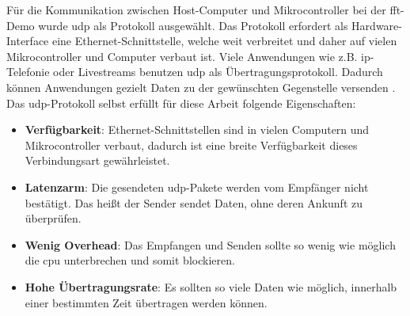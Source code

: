 \documentclass[../EDF Master Thesis.tex]{subfiles}
\begin{document}
    Für die Kommunikation zwischen Host-Computer und Mikrocontroller bei der \ac{fft}-Demo wurde \ac{udp} als Protokoll ausgewählt.
    Das Protokoll erfordert als Hardware-Interface eine Ethernet-Schnittstelle, welche weit verbreitet und daher auf vielen Mikrocontroller und Computer verbaut ist.
    Viele Anwendungen wie z.B. \ac{ip}-Telefonie oder Livestreams benutzen \ac{udp} als Übertragungsprotokoll.
    Dadurch können Anwendungen gezielt Daten zu der gewünschten Gegenstelle versenden \parencite{elektronik_kompendium}.
    Das \ac{udp}-Protokoll selbst erfüllt für diese Arbeit folgende Eigenschaften:
    \begin{itemize}
        \item \textbf{Verfügbarkeit}: Ethernet-Schnittstellen sind in vielen Computern und Mikrocontroller verbaut, dadurch ist eine breite Verfügbarkeit dieses Verbindungsart gewährleistet.
        \item \textbf{Latenzarm}: Die gesendeten \ac{udp}-Pakete werden vom Empfänger nicht bestätigt. Das heißt der Sender sendet Daten, ohne deren Ankunft zu überprüfen.
        \item \textbf{Wenig Overhead}: Das Empfangen und Senden sollte so wenig wie möglich die \ac{cpu} unterbrechen und somit blockieren.
        \item \textbf{Hohe Übertragungsrate}: Es sollten so viele Daten wie möglich, innerhalb einer bestimmten Zeit übertragen werden können.
    \end{itemize}
\end{document}
